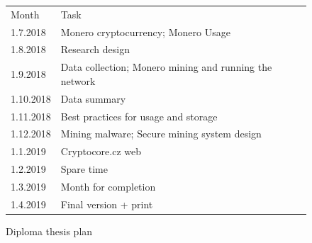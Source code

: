 \documentclass[
  printed, %
  table,   %
  nolof,     %
  nolot,     %
           oneside, color
]{fithesis3}
\begin{document}
\begin{figure}[H]
\center
\begin{tabular}{ll}
Month     & Task                                              \\
1.7.2018  & Monero cryptocurrency; Monero Usage              \\
1.8.2018  & Research design  \\
1.9.2018  & Data collection; Monero mining and running the network \\
1.10.2018 & Data summary                                   \\
1.11.2018 & Best practices for usage and storage                \\
1.12.2018 & Mining malware; Secure mining system design     \\
1.1.2019  & Cryptocore.cz web            \\
1.2.2019  & Spare time                                           \\
1.3.2019  & Month for completion                                 \\
1.4.2019  & Final version + print                            
\end{tabular}
\caption{Diploma thesis plan}
\label{ssme-thesis-plan}
\end{figure}



\printbibliography[heading=bibintoc]

\appendix

\label{monero-user-study-pdf}


\label{monero-miners-study-pdf}


\label{monero-pool-study-pdf}

\end{document}
